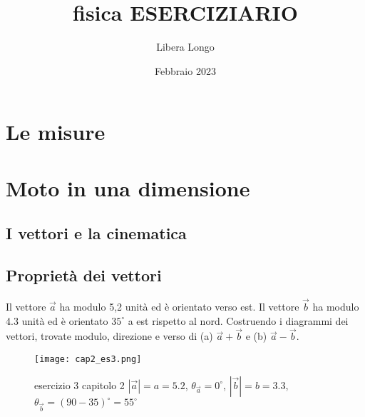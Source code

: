 \documentclass{article}
\title{fisica ESERCIZIARIO}
\author{Libera Longo}
\date{Febbraio 2023}
\begin{document}
    \maketitle
\section{Le misure}
\section{Moto in una dimensione}
    \subsection{I vettori e la cinematica}
    \subsection{Proprietà dei vettori}
        \begin{ExerciseList}
\Exercise[number=3]
    Il vettore $\vec{a}$ ha modulo 5,2 unità ed è orientato verso est. Il vettore $\vec b$ ha modulo 4.3 unità ed è orientato $35^{\circ}$ a est rispetto al nord. Costruendo i diagrammi dei vettori, trovate modulo, direzione e verso di (a) $\vec a + \vec b$ e (b) $\vec a - \vec b$.
\Answer
	\begin{figure}[H]
		\texttt{[image: cap2\_es3.png]}
            \caption{esercizio 3 capitolo 2 $ | \vec a | = a = 5.2 $,  $ \theta_{\vec a} = 0^\circ $, $ | \vec b | = b = 3.3 $, $ \theta_{\vec b} = (90 - 35)^\circ = 55^\circ $}
            \label{fig:cap2_es3}
	\end{figure}
        
        $  $
        
                \end{ExerciseList}
\end{document}
